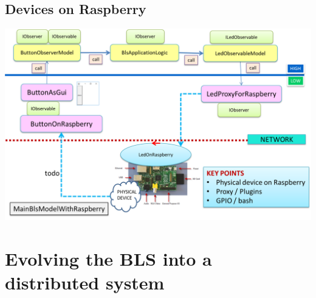 \documentclass[10pt,a4paper,openright,twoside]{C:/Didattica/git/lab2014Bo/it.unibo.iss2015intro/docsInternal/contents/llncs}
\begin{document}

\subsection{Devices on Raspberry}

\medskip 
\includegraphics[scale = 0.5]{img/bls18/bls18Obj2Rasp.png}





\newpage
\section{Evolving the BLS into a distributed system}
\end{document}

